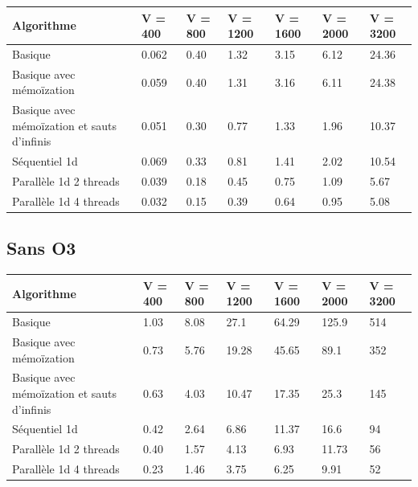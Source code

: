 \documentclass[a4paper,11pt]{article}
\begin{document}
\begin{center}
  \begin{tabular}{p{3.5cm} | p{1.6cm} | p{1.6cm} | p{1.8cm} | p{1.8cm} | p{1.8cm} | p{1.8cm}}
    \textbf{Algorithme} &  \textbf{V = 400} &  \textbf{V = 800} &  \textbf{V = 1200} &  \textbf{V = 1600} &  \textbf{V = 2000} &  \textbf{V = 3200} \\
    \hline
    Basique & 0.062 & 0.40 & 1.32 & 3.15 & 6.12 & 24.36 \\
    \hline
    Basique avec mémoïzation & 0.059 & 0.40 & 1.31 & 3.16 & 6.11 & 24.38 \\
    \hline
    Basique avec mémoïzation et sauts d'infinis & 0.051 & 0.30 & 0.77 & 1.33 & 1.96 & 10.37 \\
    \hline
    Séquentiel 1d & 0.069 & 0.33 & 0.81 & 1.41 & 2.02 & 10.54 \\
    \hline
    Parallèle 1d 2 threads & 0.039 & 0.18 & 0.45 & 0.75 & 1.09 & 5.67 \\
    \hline
    Parallèle 1d 4 threads & 0.032 & 0.15 & 0.39 & 0.64 & 0.95 & 5.08 \\
    \hline
  \end{tabular}
\end{center}

\subsection{Sans O3}

\begin{center}
  \begin{tabular}{p{3.5cm} | p{1.6cm} | p{1.6cm} | p{1.8cm} | p{1.8cm} | p{1.8cm} | p{1.8cm}}
    \textbf{Algorithme} &  \textbf{V = 400} &  \textbf{V = 800} &  \textbf{V = 1200} &  \textbf{V = 1600} &  \textbf{V = 2000} &  \textbf{V = 3200} \\
    \hline
    Basique & 1.03 & 8.08 & 27.1 & 64.29 & 125.9 & 514 \\
    \hline
    Basique avec mémoïzation & 0.73 & 5.76 & 19.28 & 45.65 & 89.1 & 352 \\
    \hline
    Basique avec mémoïzation et sauts d'infinis & 0.63 & 4.03 & 10.47 & 17.35 & 25.3 & 145 \\
    \hline
    Séquentiel 1d & 0.42 & 2.64 & 6.86 & 11.37 & 16.6 & 94 \\
    \hline
    Parallèle 1d 2 threads & 0.40 & 1.57 & 4.13 & 6.93 & 11.73 & 56 \\
    \hline
    Parallèle 1d 4 threads & 0.23 & 1.46 & 3.75 & 6.25 & 9.91 & 52 \\
    \hline
  \end{tabular}
\end{center}
\end{document}
